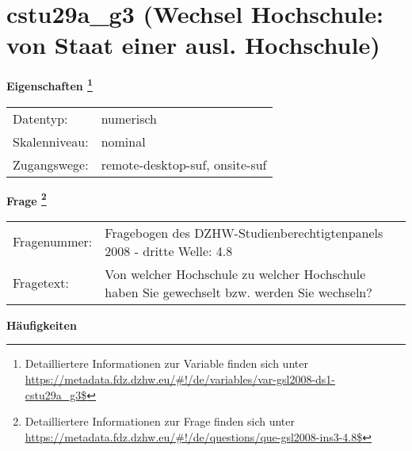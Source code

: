 
    \setcounter{footnote}{0}

    \vspace*{-1.8cm}
	\section{cstu29a\_g3 (Wechsel Hochschule: von Staat einer ausl. Hochschule)}
	\label{section:cstu29a_g3}



    \vspace*{0.5cm}
    \noindent\textbf{Eigenschaften
	\footnote{Detailliertere Informationen zur Variable finden sich unter
		\url{https://metadata.fdz.dzhw.eu/\#!/de/variables/var-gsl2008-ds1-cstu29a_g3$}}}\\
	\begin{tabularx}{\hsize}{@{}lX}
	Datentyp: & numerisch \\
	Skalenniveau: & nominal \\
	Zugangswege: &
	  remote-desktop-suf, 
	  onsite-suf
 \\
    \end{tabularx}



				\vspace*{0.5cm}
                \noindent\textbf{Frage
	                \footnote{Detailliertere Informationen zur Frage finden sich unter
		              \url{https://metadata.fdz.dzhw.eu/\#!/de/questions/que-gsl2008-ins3-4.8$}}}\\
				\begin{tabularx}{\hsize}{@{}lX}
					Fragenummer: &
					  Fragebogen des DZHW-Studienberechtigtenpanels 2008 - dritte Welle:
					  4.8
 \\
					Fragetext: & Von welcher Hochschule zu welcher Hochschule haben Sie gewechselt bzw. werden Sie wechseln? \\
				\end{tabularx}





        		\vspace*{0.5cm}
                \noindent\textbf{Häufigkeiten}

